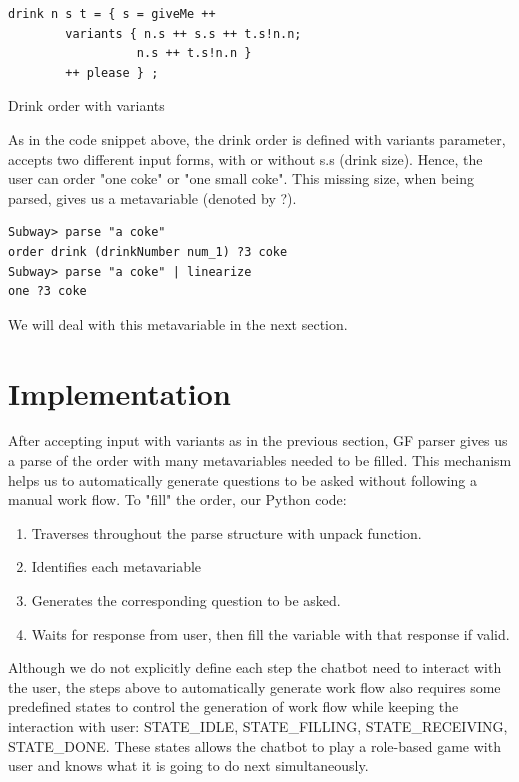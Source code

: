 \documentclass[12pt]{article}
\begin{document}
\begin{listing}[ht]
	\begin{verbatim}
drink n s t = { s = giveMe ++
		variants { n.s ++ s.s ++ t.s!n.n; 
				  n.s ++ t.s!n.n } 
		++ please } ;
	\end{verbatim}
	\caption{Drink order with variants}
\end{listing}

As in the code snippet above, the drink order is defined with variants parameter, accepts two different input forms, with or without s.s (drink size). Hence, the user can order "one coke" or "one small coke". This missing size, when being parsed, gives us a metavariable (denoted by ?).

\begin{verbatim}
Subway> parse "a coke"
order drink (drinkNumber num_1) ?3 coke
Subway> parse "a coke" | linearize
one ?3 coke
\end{verbatim}

We will deal with this metavariable in the next section.

\section{Implementation}
After accepting input with variants as in the previous section, GF parser gives us a parse of the order with many metavariables needed to be filled. This mechanism helps us to automatically generate questions to be asked without following a manual work flow. To "fill" the order, our Python code:

\begin{enumerate}
    \item Traverses throughout the parse structure with unpack function.
    \item Identifies each metavariable
    \item Generates the corresponding question to be asked.
    \item Waits for response from user, then fill the variable with that response if valid.
\end{enumerate}


Although we do not explicitly define each step the chatbot need to interact with the user, the steps above to automatically generate work flow also requires some predefined states to control the generation of work flow while keeping the interaction with user: STATE\_IDLE, STATE\_FILLING, STATE\_RECEIVING, STATE\_DONE. These states allows the chatbot to play a role-based game with user and knows what it is going to do next simultaneously.
\end{document}
